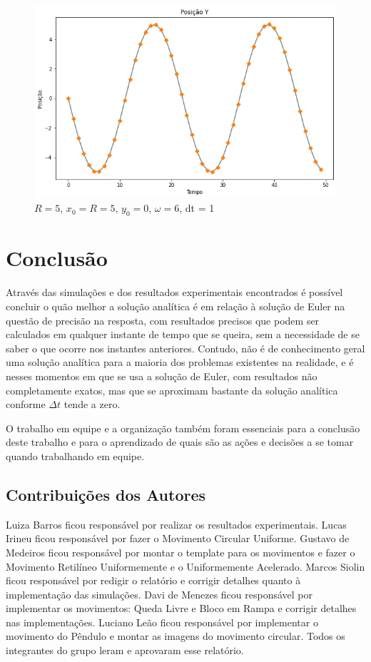\documentclass[12pt]{article}
\begin{document}
\begin{figure}[H]
  \centering
  \includegraphics[scale = 0.6]{imagens/(mcu)posicaoydt=1tf=50.png}
  \caption{$R = 5$, $x_0 = R = 5$, $y_0 = 0$, $\omega = 6$, dt = 1}
\end{figure}
\section{Conclusão}

Através das simulações e dos resultados experimentais encontrados é possível concluir o quão melhor a solução analítica é em relação à solução de Euler na questão de precisão na resposta, com resultados precisos que podem ser calculados em qualquer instante de tempo que se queira, sem a necessidade de se saber o que ocorre nos instantes anteriores. Contudo, não é de conhecimento geral uma solução analítica para a maioria dos problemas existentes na realidade, e é nesses momentos em que se usa a solução de Euler, com resultados não completamente exatos, mas que se aproximam bastante da solução analítica conforme $\Delta t$ tende a zero.

O trabalho em equipe e a organização também foram essenciais para a conclusão deste trabalho e para o aprendizado de quais são as ações e decisões a se tomar quando trabalhando em equipe.

\subsection*{Contribuições dos Autores}

Luiza Barros ficou responsável por realizar os resultados experimentais. Lucas Irineu ficou responsável por fazer o Movimento Circular Uniforme. Gustavo de Medeiros ficou responsável por montar o template para os movimentos e fazer o Movimento Retilíneo Uniformemente e o Uniformemente Acelerado. Marcos Siolin ficou responsável por redigir o relatório e corrigir detalhes quanto à implementação das simulações. Davi de Menezes ficou responsável por implementar os movimentos: Queda Livre e Bloco em Rampa e corrigir detalhes nas implementações. Luciano Leão ficou responsável por implementar o movimento do Pêndulo e montar as imagens do movimento circular. Todos os integrantes do grupo leram e aprovaram esse relatório.
\end{document}
